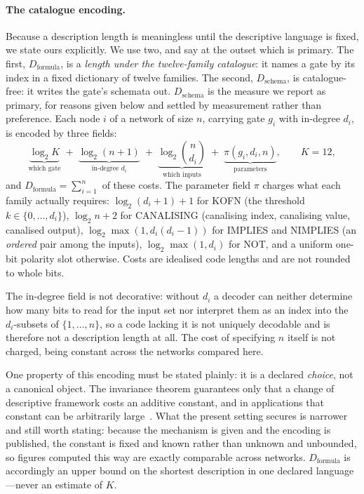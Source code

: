 \documentclass[11pt]{article}
\begin{document}
\paragraph{The catalogue encoding.}
Because a description length is meaningless until the descriptive language is
fixed, we state ours explicitly.  We use two, and say at the outset which is
primary.  The first, $D_{\mathrm{formula}}$, is a \emph{length under the
twelve-family catalogue}: it names a gate by its index in a fixed dictionary of
twelve families.  The second, $D_{\mathrm{schema}}$, is catalogue-free: it
writes the gate's schemata out.  $D_{\mathrm{schema}}$ is the measure we report
as primary, for reasons given below and settled by measurement rather than
preference.  Each node $i$ of a network of size $n$,
carrying gate $g_i$ with in-degree $d_i$, is encoded by three fields:
\[
\underbrace{\log_2 K}_{\text{which gate}}
\;+\;
\underbrace{\log_2 (n+1)}_{\text{in-degree } d_i}
\;+\;
\underbrace{\log_2\!\binom{n}{d_i}}_{\text{which inputs}}
\;+\;
\underbrace{\pi(g_i,d_i,n)}_{\text{parameters}},
\qquad K=12,
\]
and $D_{\mathrm{formula}}=\sum_{i=1}^{n}$ of these costs.  The parameter field
$\pi$ charges what each family actually requires: $\log_2(d_i+1)+1$ for KOFN
(the threshold $k\in\{0,\ldots,d_i\}$), $\log_2 n+2$ for CANALISING (canalising
index, canalising value, canalised output), $\log_2\max(1,d_i(d_i-1))$ for
IMPLIES and NIMPLIES (an \emph{ordered} pair among the inputs),
$\log_2\max(1,d_i)$ for NOT, and a uniform one-bit polarity slot otherwise.
Costs are idealised code lengths and are not rounded to whole bits.

The in-degree field is not decorative: without $d_i$ a decoder can neither
determine how many bits to read for the input set nor interpret them as an index
into the $d_i$-subsets of $\{1,\ldots,n\}$, so a code lacking it is not uniquely
decodable and is therefore not a description length at all.  The cost of
specifying $n$ itself is not charged, being constant across the networks
compared here.

One property of this encoding must be stated plainly: it is a declared
\emph{choice}, not a canonical object.  The
invariance theorem guarantees only that a change of descriptive framework costs
an additive constant, and in applications that constant can be arbitrarily
large~\cite{zenildecomposition}.  What the present setting secures is narrower
and still worth stating: because the mechanism is given and the encoding is
published, the constant is fixed and known rather than unknown and unbounded, so
figures computed this way are exactly comparable across networks.
$D_{\mathrm{formula}}$ is accordingly an upper bound on the shortest description
in one declared language---never an estimate of $K$.
\end{document}
